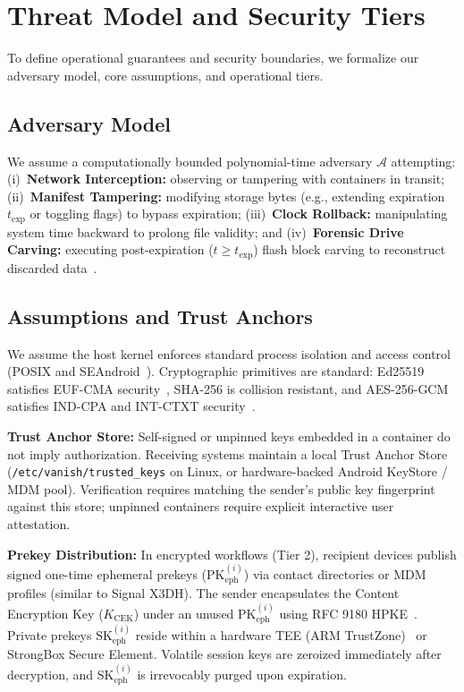 \section{Threat Model and Security Tiers}
\label{sec:threat_model}

To define operational guarantees and security boundaries, we formalize our adversary model, core assumptions, and operational tiers.

\subsection{Adversary Model}
We assume a computationally bounded polynomial-time adversary $\mathcal{A}$ attempting: (i)~\textbf{Network Interception:} observing or tampering with containers in transit; (ii)~\textbf{Manifest Tampering:} modifying storage bytes (e.g., extending expiration $t_{\text{exp}}$ or toggling flags) to bypass expiration; (iii)~\textbf{Clock Rollback:} manipulating system time backward to prolong file validity; and (iv)~\textbf{Forensic Drive Carving:} executing post-expiration ($t \ge t_{\text{exp}}$) flash block carving to reconstruct discarded data~\cite{reardon2013sok}.

\subsection{Assumptions and Trust Anchors}
We assume the host kernel enforces standard process isolation and access control (POSIX and SEAndroid~\cite{smalley2013security}). Cryptographic primitives are standard: Ed25519 satisfies EUF-CMA security~\cite{brendel2021provable}, SHA-256 is collision resistant, and AES-256-GCM satisfies IND-CPA and INT-CTXT security~\cite{mcgrew2004security}.

\textbf{Trust Anchor Store:} Self-signed or unpinned keys embedded in a container do not imply authorization. Receiving systems maintain a local Trust Anchor Store (\texttt{/etc/vanish/trusted\_keys} on Linux, or hardware-backed Android KeyStore / MDM pool). Verification requires matching the sender's public key fingerprint against this store; unpinned containers require explicit interactive user attestation.

\textbf{Prekey Distribution:} In encrypted workflows (Tier 2), recipient devices publish signed one-time ephemeral prekeys ($\text{PK}_{\text{eph}}^{(i)}$) via contact directories or MDM profiles (similar to Signal X3DH). The sender encapsulates the Content Encryption Key ($K_{\text{CEK}}$) under an unused $\text{PK}_{\text{eph}}^{(i)}$ using RFC 9180 HPKE~\cite{rfc9180hpke}. Private prekeys $\text{SK}_{\text{eph}}^{(i)}$ reside within a hardware TEE (ARM TrustZone)~\cite{armtrustzone} or StrongBox Secure Element. Volatile session keys are zeroized immediately after decryption, and $\text{SK}_{\text{eph}}^{(i)}$ is irrevocably purged upon expiration.

